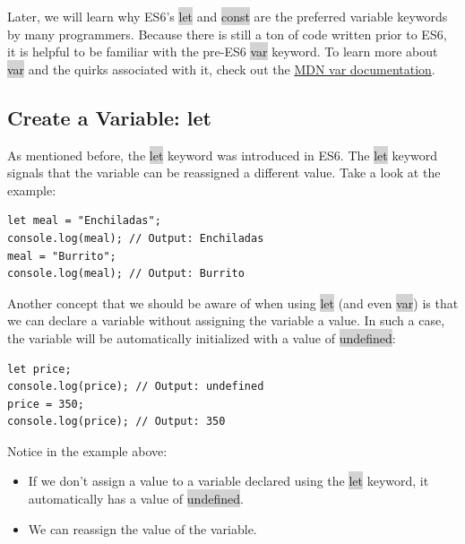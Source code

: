 \documentclass[11pt]{article}
\begin{document}
Later, we will learn why ES6’s \colorbox{lightgray}{let} and \colorbox{lightgray}{const} are the preferred variable keywords by many programmers. Because there is still a ton of code written prior to ES6, it is helpful to be familiar with the pre-ES6 \colorbox{lightgray}{var} keyword. To learn more about \colorbox{lightgray}{var} and the quirks associated with it, check out the \href{https://developer.mozilla.org/en-US/docs/Web/JavaScript/Reference/Statements/var}{MDN var documentation}. 
\subsection{Create a Variable: let}
As mentioned before, the \colorbox{lightgray}{let} keyword was introduced in ES6. The \colorbox{lightgray}{let} keyword signals that the variable can be reassigned a different value. Take a look at the example: 
\begin{lstlisting}
let meal = "Enchiladas";
console.log(meal); // Output: Enchiladas
meal = "Burrito";
console.log(meal); // Output: Burrito
\end{lstlisting}
Another concept that we should be aware of when using \colorbox{lightgray}{let} (and even \colorbox{lightgray}{var}) is that we can declare a variable without assigning the variable a value. In such a case, the variable will be automatically initialized with a value of \colorbox{lightgray}{undefined}:
\begin{lstlisting}
let price;
console.log(price); // Output: undefined
price = 350;
console.log(price); // Output: 350
\end{lstlisting}
Notice in the example above: 
\begin{itemize}[leftmargin = *]
\item If we don’t assign a value to a variable declared using the \colorbox{lightgray}{let} keyword, it automatically has a value of \colorbox{lightgray}{undefined}.
\item We can reassign the value of the variable.
\end{itemize}
\end{document}
